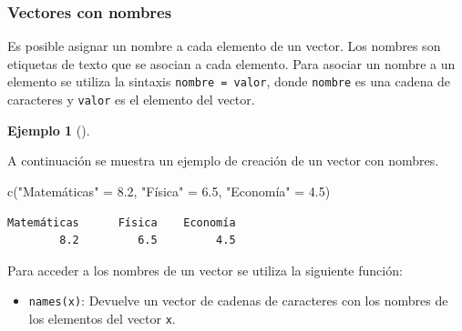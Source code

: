 \documentclass[
  a4paper,
]{scrreport}
\newenvironment{Shaded}{\begin{snugshade}}{\end{snugshade}}
\newcommand{\FloatTok}[1]{\textcolor[rgb]{0.68,0.00,0.00}{#1}}
\newcommand{\FunctionTok}[1]{\textcolor[rgb]{0.28,0.35,0.67}{#1}}
\newcommand{\NormalTok}[1]{\textcolor[rgb]{0.00,0.23,0.31}{#1}}
\newcommand{\OtherTok}[1]{\textcolor[rgb]{0.00,0.23,0.31}{#1}}
\newcommand{\StringTok}[1]{\textcolor[rgb]{0.13,0.47,0.30}{#1}}
\providecommand{\tightlist}{%
  \setlength{\itemsep}{0pt}\setlength{\parskip}{0pt}}\usepackage{longtable,booktabs,array}
\theoremstyle{definition}
\theoremstyle{definition}
\newtheorem{example}{Ejemplo}[chapter]
\theoremstyle{remark}
\begin{document}
\hypertarget{vectores-con-nombres}{%
\subsubsection{Vectores con nombres}\label{vectores-con-nombres}}

Es posible asignar un nombre a cada elemento de un vector. Los nombres
son etiquetas de texto que se asocian a cada elemento. Para asociar un
nombre a un elemento se utiliza la sintaxis \texttt{nombre\ =\ valor},
donde \texttt{nombre} es una cadena de caracteres y \texttt{valor} es el
elemento del vector.

\leavevmode{}%
\begin{example}[]\label{exm-vectores-con-nombre}

A continuación se muestra un ejemplo de creación de un vector con
nombres.

\begin{Shaded}
\begin{Highlighting}[]
\FunctionTok{c}\NormalTok{(}\StringTok{"Matemáticas"} \OtherTok{=} \FloatTok{8.2}\NormalTok{, }\StringTok{"Física"} \OtherTok{=} \FloatTok{6.5}\NormalTok{, }\StringTok{"Economía"} \OtherTok{=} \FloatTok{4.5}\NormalTok{)}
\end{Highlighting}
\end{Shaded}

\begin{verbatim}
Matemáticas      Física    Economía 
        8.2         6.5         4.5 
\end{verbatim}

\end{example}

Para acceder a los nombres de un vector se utiliza la siguiente función:

\begin{itemize}
\tightlist
\item
  \texttt{names(x)}: Devuelve un vector de cadenas de caracteres con los
  nombres de los elementos del vector \texttt{x}.
\end{itemize}
\end{document}
